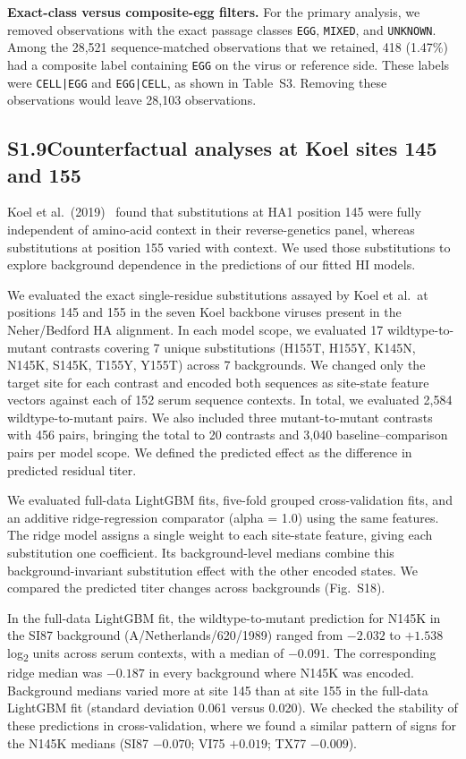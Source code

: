 \documentclass[12pt]{article}
\begin{document}
\textbf{Exact-class versus composite-egg filters.} For the primary analysis, we removed observations with the exact passage classes \texttt{EGG}, \texttt{MIXED}, and \texttt{UNKNOWN}. Among the 28,521 sequence-matched observations that we retained, 418 (1.47\%) had a composite label containing \texttt{EGG} on the virus or reference side. These labels were \texttt{CELL|EGG} and \texttt{EGG|CELL}, as shown in Table~S3. Removing these observations would leave 28,103 observations.

\subsection*{S1.9\quad Counterfactual analyses at Koel sites 145 and 155}

Koel et al.\ (2019)~\cite{Koel2019JGenVirol} found that substitutions at HA1 position 145 were fully independent of amino-acid context in their reverse-genetics panel, whereas substitutions at position 155 varied with context. We used those substitutions to explore background dependence in the predictions of our fitted HI models.

We evaluated the exact single-residue substitutions assayed by Koel et al.\ at positions 145 and 155 in the seven Koel backbone viruses present in the Neher/Bedford HA alignment. In each model scope, we evaluated 17 wildtype-to-mutant contrasts covering 7 unique substitutions (H155T, H155Y, K145N, N145K, S145K, T155Y, Y155T) across 7 backgrounds. We changed only the target site for each contrast and encoded both sequences as site-state feature vectors against each of 152 serum sequence contexts. In total, we evaluated 2,584 wildtype-to-mutant pairs. We also included three mutant-to-mutant contrasts with 456 pairs, bringing the total to 20 contrasts and 3,040 baseline--comparison pairs per model scope. We defined the predicted effect as the difference in predicted residual titer.

We evaluated full-data LightGBM fits, five-fold grouped cross-validation fits, and an additive ridge-regression comparator (alpha = 1.0) using the same features. The ridge model assigns a single weight to each site-state feature, giving each substitution one coefficient. Its background-level medians combine this background-invariant substitution effect with the other encoded states. We compared the predicted titer changes across backgrounds (Fig.~S18).

In the full-data LightGBM fit, the wildtype-to-mutant prediction for N145K in the SI87 background (A/Netherlands/620/1989) ranged from $-2.032$ to $+1.538$ log\textsubscript{2} units across serum contexts, with a median of $-0.091$. The corresponding ridge median was $-0.187$ in every background where N145K was encoded. Background medians varied more at site 145 than at site 155 in the full-data LightGBM fit (standard deviation 0.061 versus 0.020). We checked the stability of these predictions in cross-validation, where we found a similar pattern of signs for the N145K medians (SI87 $-0.070$; VI75 $+0.019$; TX77 $-0.009$).
\end{document}
